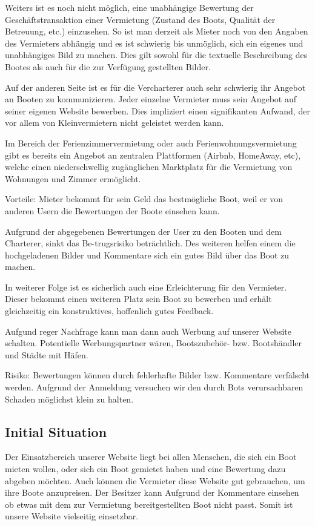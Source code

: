 \documentclass[12pt]{article}
\theoremstyle{definition}
\begin{document}
	Weiters ist es noch nicht möglich, eine unabhängige Bewertung der Geschäfts\-trans\-aktion einer Vermietung (Zustand des Boots, Qualität der Betreuung, etc.) einzusehen. So ist man derzeit als Mieter noch von den Angaben des Vermieters abhängig und es ist schwierig bis unmöglich, sich ein eigenes und unabhängiges Bild zu machen. Dies gilt sowohl für die textuelle Beschreibung des Bootes als auch für die zur Verfügung gestellten Bilder.
	
	Auf der anderen Seite ist es für die Vercharterer auch sehr schwierig ihr Angebot an Booten zu kommunizieren. Jeder einzelne Vermieter muss sein Angebot auf seiner eigenen Website bewerben. Dies impliziert einen signifikanten Aufwand, der vor allem von Kleinvermietern nicht geleistet werden kann.
	
	Im Bereich der Ferienzimmervermietung oder auch Ferienwohnungsvermietung gibt es bereits ein Angebot an zentralen Plattformen (Airbnb, HomeAway, etc), welche einen niederschwellig zugänglichen Marktplatz für die Vermietung von Wohnungen und Zimmer ermöglicht.
	
	Vorteile:
	Mieter bekommt für sein Geld das bestmögliche Boot, weil er von anderen Usern die Bewertungen der Boote einsehen kann.
	
	Aufgrund der abgegebenen Bewertungen der User zu den Booten und dem Charterer, sinkt das Be-trugsrisiko beträchtlich. Des weiteren helfen einem die hochgeladenen Bilder und Kommentare sich ein gutes Bild über das Boot zu machen.
	
	In weiterer Folge ist es sicherlich auch eine Erleichterung für den Vermieter. Dieser bekommt einen weiteren Platz sein Boot zu bewerben und erhält gleichzeitig ein konstruktives, hoffenlich gutes Feedback.
	
	Aufgund reger Nachfrage kann man dann auch Werbung auf unserer Website schalten. Potentielle Werbungspartner wären, Bootszubehör- bzw. Bootshändler und Städte mit Häfen.
	
	Risiko:
	Bewertungen können durch fehlerhafte Bilder bzw. Kommentare verfälscht werden. Aufgrund der Anmeldung versuchen wir den durch Bots verursachbaren Schaden möglichst klein zu halten.	

\subsection{Initial Situation}
	Der Einsatzbereich unserer Website liegt bei allen Menschen, die sich ein Boot mieten wollen, oder sich ein Boot gemietet haben und eine Bewertung dazu abgeben möchten.
	Auch können die Vermieter diese Website gut gebrauchen, um ihre Boote anzupreisen.
	Der Besitzer kann Aufgrund der Kommentare einsehen ob etwas mit dem zur Vermietung bereitgestellten Boot nicht passt. Somit ist unsere Website vielseitig einsetzbar.	
\end{document}

